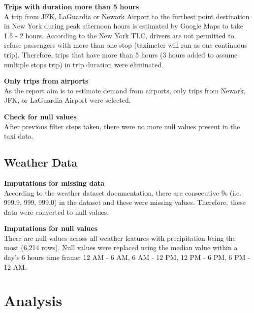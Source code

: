 \documentclass[11pt]{article}
\begin{document}
\noindent\textbf{Trips with duration more than 5 hours}
\\
A trip from JFK, LaGuardia or Newark Airport to the furthest point destination in New York during peak afternoon hours is estimated by Google Maps to take 1.5 - 2 hours. According to the New York TLC, drivers are not permitted to refuse passengers with more than one stop (taximeter will run as one continuous trip). Therefore, trips that have more than 5 hours (3 hours added to assume multiple stops trip) in trip duration were eliminated.

\noindent\textbf{Only trips from airports}
\\
As the report aim is to estimate demand from airports, only trips from Newark, JFK, or LaGuardia Airport were selected.

\noindent\textbf{Check for null values}
\\
After previous filter steps taken, there were no more null values present in the taxi data.

\subsection{Weather Data}
\noindent\textbf{Imputations for missing data}
\\
According to the weather dataset documentation, there are consecutive 9s (i.e. 999.9, 999, 999.0) in the dataset and these were missing values. Therefore, these data were converted to null values.

\noindent\textbf{Imputations for null values}
\\
There are null values across all weather features with precipitation being the most (6,214 rows). Null values were replaced using the median value within a day's 6 hours time frame; 12 AM - 6 AM, 6 AM - 12 PM, 12 PM - 6 PM, 6 PM - 12 AM.

\section{Analysis}
\end{document}
